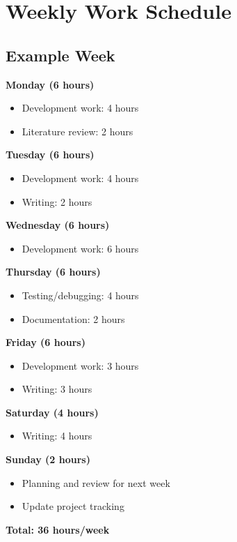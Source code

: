 \documentclass[12pt,a4paper]{article}
\begin{document}
\section{Weekly Work Schedule}

\subsection*{Example Week}

\textbf{Monday (6 hours)}
\begin{itemize}
    \item Development work: 4 hours
    \item Literature review: 2 hours
\end{itemize}

\textbf{Tuesday (6 hours)}
\begin{itemize}
    \item Development work: 4 hours
    \item Writing: 2 hours
\end{itemize}

\textbf{Wednesday (6 hours)}
\begin{itemize}
    \item Development work: 6 hours
\end{itemize}

\textbf{Thursday (6 hours)}
\begin{itemize}
    \item Testing/debugging: 4 hours
    \item Documentation: 2 hours
\end{itemize}

\textbf{Friday (6 hours)}
\begin{itemize}
    \item Development work: 3 hours
    \item Writing: 3 hours
\end{itemize}

\textbf{Saturday (4 hours)}
\begin{itemize}
    \item Writing: 4 hours
\end{itemize}

\textbf{Sunday (2 hours)}
\begin{itemize}
    \item Planning and review for next week
    \item Update project tracking
\end{itemize}

\textbf{Total: 36 hours/week}
\end{document}
